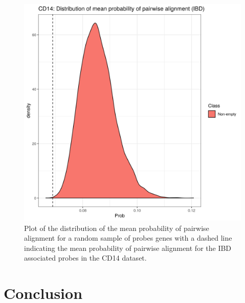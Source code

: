 \documentclass[12pt]{article} %
\begin{document}
	\begin{figure}[h]
		\centering
		\includegraphics[scale=0.75]{Images/Biology_data/Set_1000/All_datasets//Mean_alignment_probability/CD14_KEGG_INFLAMMATORY_BOWEL_DISEASE.png}
		\caption{Plot of the distribution of the mean probability of pairwise alignment for a random sample of probes genes with a dashed line indicating the mean probability of pairwise alignment for the IBD associated probes in the CD14 dataset.}
		\label{fig:results:cedar_2:mdi_cd14_ibd_alignment_prob_distn}
	\end{figure}
	
	\section{Conclusion}
	
\end{document}
